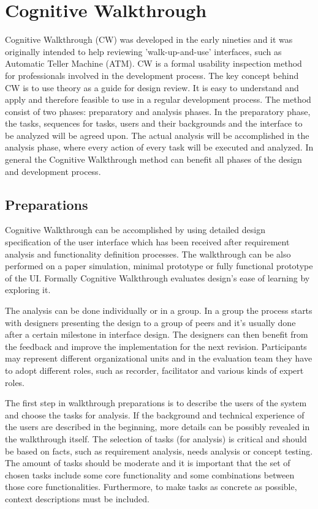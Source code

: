\documentclass[12pt,a4paper,oneside,pdftex]{report}
\begin{document}
\section{Cognitive Walkthrough}
\label{sec:cognitivewalkthrough}

Cognitive Walkthrough (CW) was developed in the early nineties and it was originally intended to help reviewing 'walk-up-and-use' interfaces, such as Automatic Teller Machine (ATM). CW is a formal usability inspection method for professionals involved in the development process. The key concept behind CW is to use theory as a guide for design review. It is easy to understand and apply and therefore feasible to use in a regular development process. \cite{RefWorks:19, RefWorks:18} 
The method consist of two phases: preparatory and analysis phases. In the preparatory phase, the tasks, sequences for tasks, users and their backgrounds and the interface to be analyzed will be agreed upon.  The actual analysis will be accomplished in the analysis phase, where every action of every task will be executed and analyzed. In general the Cognitive Walkthrough method can benefit all phases of the design and development process.\cite{RefWorks:26}

\subsection{Preparations}
Cognitive Walkthrough can be accomplished by using detailed design specification of the user interface which has been received after requirement analysis and functionality definition processes. The walkthrough can be also performed  on a paper simulation, minimal prototype or fully functional prototype of the UI. Formally Cognitive Walkthrough evaluates design's ease of learning by exploring it. \cite{RefWorks:26}

The analysis can be done individually or in a group. In a group the process starts with designers presenting the design to a group of peers and it's usually done after a certain milestone in interface design. The designers can then benefit from the feedback and improve the implementation for the next revision. Participants may represent different organizational units and in the evaluation team they have to adopt different roles, such as recorder, facilitator and various kinds of expert roles. \cite{RefWorks:26}

The first step in walkthrough preparations is to describe the users of the system and choose the tasks for analysis. If the background and technical experience of the users are described in the beginning, more details can be possibly revealed in the walkthrough itself. The selection of tasks (for analysis) is critical and should be based on facts, such as requirement analysis, needs analysis or concept testing. The amount of tasks should be moderate and it is important that the set of chosen tasks include some core functionality and some combinations between those core functionalities. Furthermore, to make tasks as concrete as possible, context descriptions must be included. \cite{RefWorks:26}
\end{document}
